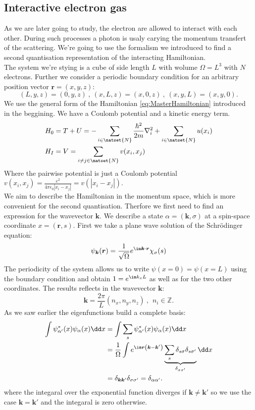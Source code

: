 \documentclass[../main.tex]{subfile}
\begin{document}
\subsection{Interactive electron gas}
As we are later going to study, the electron are allowed to interact with each other. During such processes a photon is
usaly carying the momentum transfert of the scattering. We're going to use the formalism we introduced to 
find a second quantisation representation of the interacting Hamiltonian.\\

The system we're stying is a cube of side length $L$ with wolume $\Omega = L^3$ with $N$ electrons. Further we consider a periodic boundary condition for an arbitrary 
position vector $\bm{r} = (x,y,z)$:
\[
    (L,y,z) = (0,y,z)~,~(x,L,z) = (x,0,z)~,~(x,y,L) = (x,y,0).
\]  
We use the general form of the Hamiltonian \ref{eq:MasterHamiltonian} introduced in the beggining. We have a Coulomb potential and a kinetic energy term.
\begin{align}
    H_0 &= T+U =- \sum_{i\in \natset{N}} \frac{\hbar^2}{2m}\nabla_i^2 + \sum_{i\in \natset{N}} u(x_i)\\
    H_I &= V= \sum_{i\neq j \in \natset{N}} v(x_i, x_j)
\end{align} 
Where the pairwise potential is just a Coulomb potential $v(x_i, x_j) = \frac{e^2}{4\pi\epsilon_0|x_i - x_j|} = v(|x_i - x_j|)$.\\
 We aim to describe the Hamiltonian in the momentum space, which is more convenient for the second quantisation. Therfore we first
need to find an expression for the wavevector $\bm{k}$. We describe a state $\alpha = (\bm{k}, \sigma)$ at a spin-space coordinate $x = (\bm{r}, s)$. First we take a plane wave solution of the Schrödinger equation:
\[
    \psi_{\bm{k}}(\bm{r}) = \frac{1}{\sqrt{\Omega}} e^{\im \bm{k}\cdot\bm{r}} \chi_\sigma(s)
\]
The periodicity of the system allows us to write $\psi(x=0) = \psi(x=L)$ using the boundary condition and obtain 
$1= e^{\im k_x L}$ as well as for the two other coordinates. The results reflects in the wavevector $\bm{k}$:
\[
    \bm{k} = \frac{2\pi}{L}(n_x, n_y, n_z)~,~~n_i\in \mathbb{Z}.
\]
As we saw earlier the eigenfunctions build a complete basis:
\begin{align*}
    \int \psi^{\ast}_{\alpha'}(x) \psi_{\alpha}(x) \dd x &= \int \sum_{s} \psi^{\ast}_{\alpha'}(x) \psi_{\alpha}(x) \dd x \\
    &=\frac{1}{\Omega} \int e^{\im\bm{r}\left(\bm{k}- \bm{k}'\right)} \underbrace{\sum_s \delta_{s\sigma}\delta_{s\sigma'}}_{\delta_{\sigma\sigma'}} \dd x\\
    &= \delta_{\bm{k}\bm{k}'}\delta_{\sigma\sigma'} = \delta_{\alpha\alpha'}.
\end{align*}    
where the integaral over the exponential function diverges if $\bm{k} \neq \bm{k}'$ so we use the case $\bm{k} = \bm{k}'$ and the integaral is zero otherwise.
\end{document}
